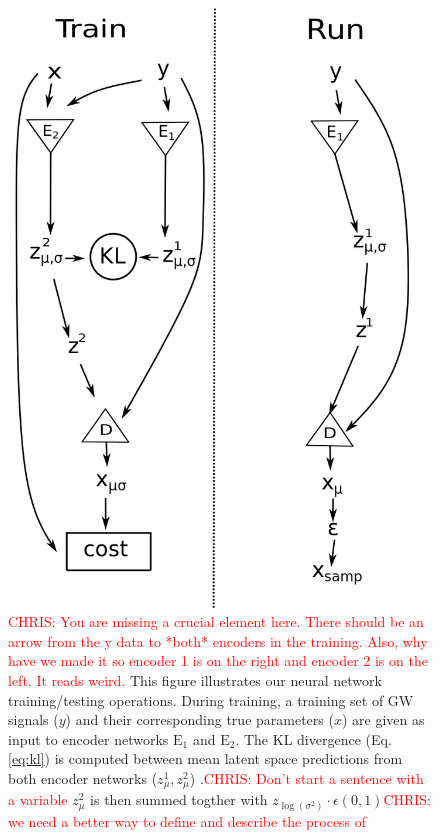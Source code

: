 \documentclass[%
showpacs,
 amsmath,amssymb,
 aps,
 twocolumn,
 prl,
 reprint,
floatfix,
]{revtex4-1}
\newcommand{\chris}[1]{\textcolor{red}{CHRIS: #1}}
\begin{document}
\begin{figure}
    \includegraphics[width=\columnwidth]{images/network_setup.png}
    \caption{\label{fig:network_config}\chris{You are missing a crucial element
here. There should be an arrow from the y data to *both* encoders in the
training. Also, why have we made it so encoder 1 is on the right and encoder 2
is on the left. It reads weird.} This figure illustrates our neural network
training/testing operations. During training, a training set of GW signals
($y$) and their corresponding true parameters ($x$) are given as input to
encoder networks $\textrm{E}_1$ and $\textrm{E}_2$. The KL divergence (Eq.
\ref{eq:kl}) is computed between mean latent space predictions from both
encoder networks ($z^1_{\mu},z^2_{\mu}$) .\chris{Don't start a sentence with a
variable} $z^2_{\mu}$ is then summed togther with $z_{\log{(\sigma^{2})}} \cdot
\epsilon(0,1)$\chris{we need a better way to define and describe the process of
}}
\end{figure}
\end{document}
